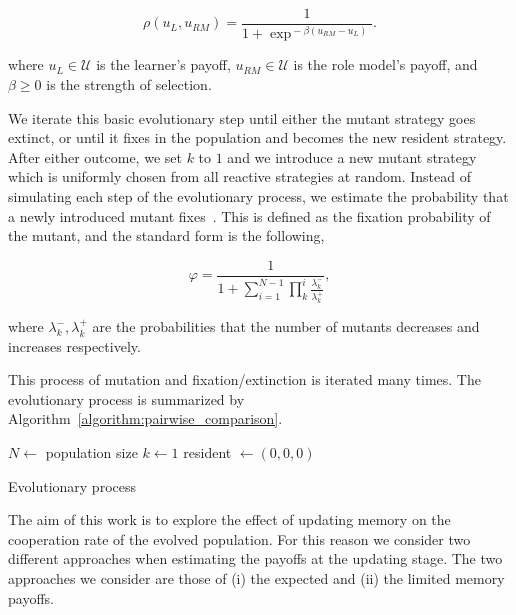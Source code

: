 \documentclass[11pt]{article}
\theoremstyle{plainCl1}
\theoremstyle{plainCl2}
\begin{document}
\begin{equation} \label{Eq:rho}
\rho(u_{L}, u_{RM}) = \frac{1}{1\!+\! \exp^{\!-\!\beta (u_{RM}\!-\!u_{L})}}.
\end{equation}

where $u_{L}\!\in\! \mathcal{U}$ is the learner's payoff, $u_{RM}\!\in\!
\mathcal{U}$ is the role model's payoff, and $\beta\!\ge\!0$ is the strength of
selection.

We iterate this basic evolutionary step until either the mutant strategy goes
extinct, or until it fixes in the population and becomes the new resident
strategy. After either outcome, we set $k$ to $1$ and we introduce a new mutant
strategy which is uniformly chosen from all reactive strategies at random.
Instead of simulating each step of the evolutionary process, we estimate the
probability that a newly introduced mutant fixes~\cite{nowak2004emergence}. This
is defined as the fixation probability of the mutant, and the standard form is
the following,

\begin{equation}\label{eq:appendix_fixation_probability}
\varphi = \frac{1}{1+\sum\limits_{i=1}^{N-1}\prod\limits_k^i \frac{\lambda^-_k}{\lambda^+_k}},
\end{equation}

where \(\lambda^-_k, \lambda^+_k\) are the probabilities that the number of
mutants decreases and increases respectively.

This process of mutation and fixation/extinction is iterated many times. The
evolutionary process is summarized by
Algorithm~\ref{algorithm:pairwise_comparison}.

\begin{algorithm}[!htbp]
  \SetAlgoLined
   $N \leftarrow$ population size\;
   $k \leftarrow 1$\;
   resident $\leftarrow (0, 0, 0)$\;
     \caption{Evolutionary process}\label{algorithm:pairwise_comparison}
\end{algorithm}

The aim of this work is to explore the effect of updating memory on the
cooperation rate of the evolved population. For this reason we consider two
different approaches when estimating the payoffs at the updating stage. The two
approaches we consider are those of (i) the expected and (ii) the limited memory
payoffs.
\end{document}
